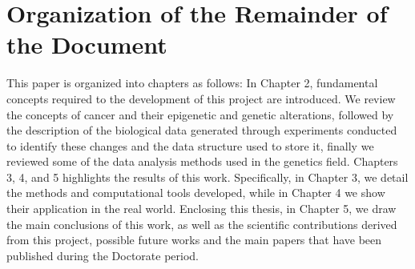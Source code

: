 \section{Organization of the Remainder of the Document}

This paper is organized into chapters as follows: In Chapter 2,
fundamental concepts required to the development of this project are introduced.
We review the concepts of cancer and their epigenetic and genetic alterations,
followed by the description of the biological data generated through experiments
conducted to identify these changes and the data structure used to store it,
finally we reviewed some of the data analysis methods used in the genetics field.
Chapters 3, 4, and 5 highlights the results of this work. Specifically, in Chapter 3,
we detail the methods and computational tools developed, while in Chapter 4 we
show their application in the real world. Enclosing this thesis, in Chapter 5,
we draw the main conclusions of this work, as well as the scientific contributions
derived from this project, possible future works and the main papers
that have been published during the Doctorate period.
